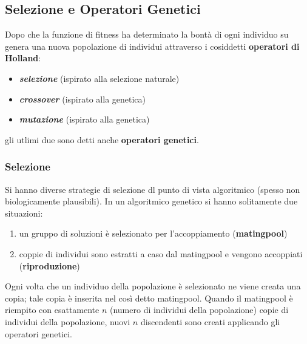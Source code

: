 \documentclass[a4paper,12pt, oneside]{book}
\begin{document}
\subsection{Selezione e Operatori Genetici}
Dopo che la funzione di fitness ha determinato la bontà di ogni
individuo su genera una nuova popolazione di individui attraverso i
cosiddetti \textbf{operatori di Holland}:
\begin{itemize}
  \item \textit{\textbf{selezione}} (ispirato alla selezione naturale)
  \item \textit{\textbf{crossover}} (ispirato alla genetica)
  \item \textit{\textbf{mutazione}} (ispirato alla genetica)
\end{itemize}
gli utlimi due sono detti anche \textbf{operatori genetici}.\\
\subsubsection{Selezione}
Si hanno diverse
strategie di selezione dl punto di vista algoritmico (spesso non
biologicamente plausibili). In un algoritmico genetico si hanno
solitamente due situazioni:
\begin{enumerate}
  \item un gruppo di soluzioni è selezionato per l’accoppiamento
  (\textbf{matingpool})
  \item coppie di individui sono estratti a caso dal matingpool e
  vengono accoppiati (\textbf{riproduzione}) 
\end{enumerate}
Ogni volta che un individuo della popolazione è selezionato ne viene
creata una copia; tale copia è inserita nel così detto
matingpool. Quando il matingpool è riempito con esattamente $n$
(numero di individui della popolazione) copie di individui della
popolazione, nuovi $n$ discendenti sono creati applicando gli
operatori genetici.\\ 
\end{document}
